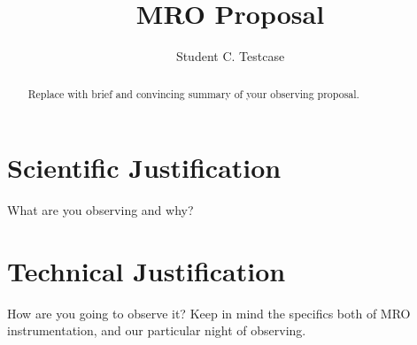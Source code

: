 \documentclass[iop]{emulateapj}
\begin{document}
\title{MRO Proposal}

\author{Student C. Testcase}

\begin{abstract}
Replace with brief and convincing summary of your observing proposal.
\end{abstract}

\section{Scientific Justification}
What are you observing and why?

\section{Technical Justification}
How are you going to observe it? Keep in mind the specifics both of MRO instrumentation, and our particular night of observing.


{}

\end{document}
